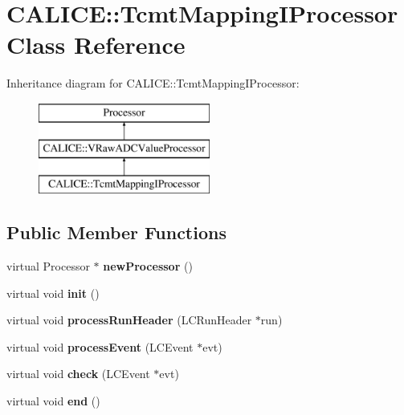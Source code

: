 \section{C\-A\-L\-I\-C\-E\-:\-:Tcmt\-Mapping\-I\-Processor Class Reference}
\label{classCALICE_1_1TcmtMappingIProcessor}
Inheritance diagram for C\-A\-L\-I\-C\-E\-:\-:Tcmt\-Mapping\-I\-Processor\-:\begin{figure}[H]
\begin{center}
\leavevmode
\includegraphics[height=3.000000cm]{classCALICE_1_1TcmtMappingIProcessor}
\end{center}
\end{figure}
\subsection*{Public Member Functions}
\begin{DoxyCompactItemize}
\item 
virtual Processor $\ast$ {\bfseries new\-Processor} ()\label{classCALICE_1_1TcmtMappingIProcessor_af68eccae5145606b935a16cb3c17a23f}

\item 
virtual void {\bfseries init} ()\label{classCALICE_1_1TcmtMappingIProcessor_ab2aacaee87955c83ede7a99d5bdcf6f9}

\item 
virtual void {\bfseries process\-Run\-Header} (L\-C\-Run\-Header $\ast$run)\label{classCALICE_1_1TcmtMappingIProcessor_a57645dbfce4fa856af7e3095baf98ebc}

\item 
virtual void {\bfseries process\-Event} (L\-C\-Event $\ast$evt)\label{classCALICE_1_1TcmtMappingIProcessor_afebd6aa1a8d9fbf9ee73994bc055992d}

\item 
virtual void {\bfseries check} (L\-C\-Event $\ast$evt)\label{classCALICE_1_1TcmtMappingIProcessor_a7300f0af5983855142d7a7305b871203}

\item 
virtual void {\bfseries end} ()\label{classCALICE_1_1TcmtMappingIProcessor_aa25fac7f90f23cca521b526f1dfdaf95}

\end{DoxyCompactItemize}
